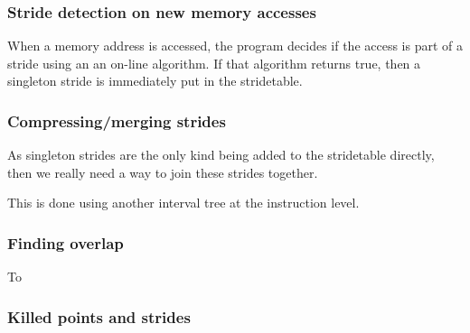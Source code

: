 \documentclass[12pt,twoside]{reedthesis}
\begin{document}
		\subsubsection{Stride detection on new memory accesses}
		
		When a memory address is accessed, the program decides if the access is part of a stride using an an on-line algorithm. If that algorithm returns true, then a singleton stride is immediately put in the stridetable. 
		
		\subsubsection{Compressing/merging strides}
		
		As singleton strides are the only kind being added to the stridetable directly, then we really need a way to join these strides together. 
		
		This is done using another interval tree at the instruction level. 
		
		
		\subsubsection{Finding overlap}
		
		To 
		
		\subsubsection{Killed points and strides}
		
		
		
		
		
		
\end{document}
